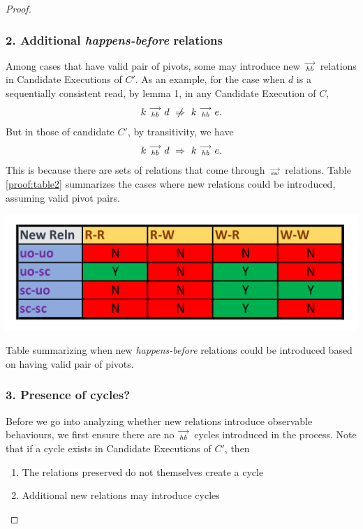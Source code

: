 \begin{proof}
        
    \subsubsection{2. Additional \textit{happens-before} relations}
        Among cases that have valid pair of pivots, some may introduce new $\stackrel{\longrightarrow}{_\textit{hb}}$ relations in Candidate Executions of $C'$. As an example, for the case when $d$ is a sequentially consistent read, by lemma 1, in any Candidate Execution of $C$,
        \begin{align*}
            \reln{k}{hb}{d} \ \centernot\Rightarrow \ \reln{k}{hb}{e}.
        \end{align*}
        But in those of candidate $C'$, by transitivity, we have 
        \begin{align*}
            k\stackrel{\longrightarrow}{_{\textit{hb}}}d \ \Rightarrow \ k\stackrel{\longrightarrow}{_{\textit{hb}}}e.
        \end{align*}
        This is because there are sets of relations that come through $\stackrel{\longrightarrow}{_\textit{sw}}$ relations. Table \ref{proof:table2} summarizes the cases where new relations could be introduced, assuming valid pivot pairs. 
        \begin{table}[H]
            \centering
            \includegraphics[scale=0.7]{Table2_Final.pdf}
            \caption{Table summarizing when new \textit{happens-before} relations could be introduced based on having valid pair of pivots.}
            \label{proof:table2}
        \end{table}
       

    \subsubsection{3. Presence of cycles?}
        Before we go into analyzing whether new relations introduce observable behaviours, we first ensure there are no $\stackrel{\longrightarrow}{_\textit{hb}}$ cycles introduced in the process. Note that if a cycle exists in Candidate Executions of $C'$, then 
        \begin{enumerate}
            \item The relations preserved do not themselves create a cycle
            \item Additional new relations may introduce cycles
        \end{enumerate}
       

\end{proof}
